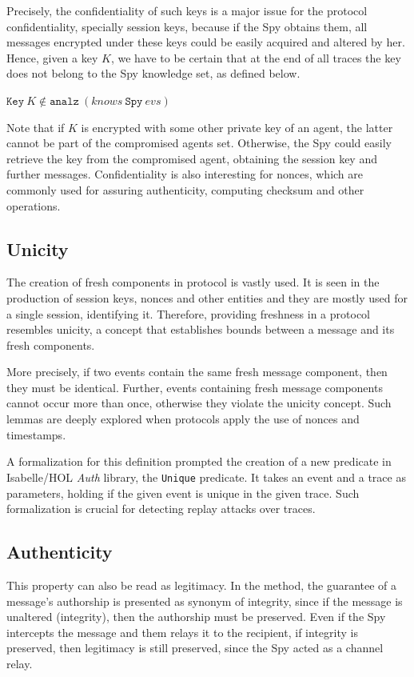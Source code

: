 Precisely, the confidentiality of such keys is a major issue for the protocol confidentiality, specially session keys, because if the Spy obtains them, all messages encrypted under these keys could be easily acquired and altered by her. Hence, given a key \(K\), we have to be certain that at the end of all traces the key does not belong to the Spy knowledge set, as defined below.

\begin{center}
  \(\texttt{Key}\ K \notin \texttt{analz}\ (knows\ \texttt{Spy}\ evs)\)
\end{center}

Note that if \(K\) is encrypted with some other private key of an agent, the latter cannot be part of the compromised agents set. Otherwise, the Spy could easily retrieve the key from the compromised agent, obtaining the session key and further messages. Confidentiality is also interesting for nonces, which are commonly used for assuring authenticity, computing checksum and other operations.



\subsection{Unicity}
The creation of fresh components in protocol is vastly used. It is seen in the production of session keys, nonces and other entities and they are mostly used for a single session, identifying it. Therefore, providing freshness in a protocol resembles unicity, a concept that establishes bounds between a message and its fresh components.

More precisely, if two events contain the same fresh message component, then they must be identical. Further, events containing fresh message components cannot occur more than once, otherwise they violate the unicity concept. Such lemmas are deeply explored when protocols apply the use of nonces and timestamps.

A formalization for this definition prompted the creation of a new predicate in Isabelle/HOL \textit{Auth} library, the \texttt{Unique} predicate. It takes an event and a trace as parameters, holding if the given event is unique in the given trace. Such formalization is crucial for detecting replay attacks over traces.



\subsection{Authenticity}
This property can also be read as legitimacy. In the method, the guarantee of a message's authorship is presented as synonym of integrity, since if the message is unaltered (integrity), then the authorship must be preserved. Even if the Spy intercepts the message and them relays it to the recipient, if integrity is preserved, then legitimacy is still preserved, since the Spy acted as a channel relay.

